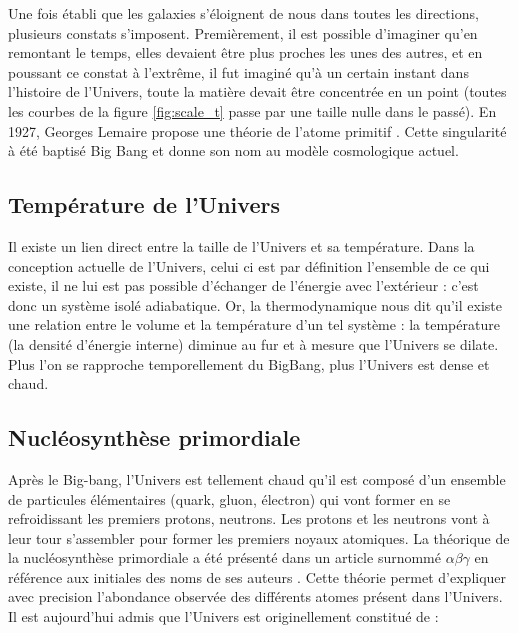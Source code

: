 Une fois établi que les galaxies s'éloignent de nous dans toutes les directions, plusieurs constats s'imposent.
Premièrement, il est possible d'imaginer qu'en remontant le temps, elles devaient être plus proches les unes des autres, et en poussant ce constat à l’extrême, il fut imaginé qu'à un certain instant dans l'histoire de l'Univers, toute la matière devait être concentrée en un point (toutes les courbes de la figure \ref{fig:scale_t} passe par une taille nulle dans le passé).
En 1927, Georges Lemaire propose une théorie de l'atome primitif \cite{1927ASSB...47...49L}.
Cette singularité à été baptisé Big Bang et donne son nom au modèle cosmologique actuel.

\subsection{Température de l'Univers}

Il existe un lien direct entre la taille de l'Univers et sa température.
Dans la conception actuelle de l'Univers, celui ci est par définition l'ensemble de ce qui existe, il ne lui est pas possible d'échanger de l’énergie avec l’extérieur : c'est donc un système isolé adiabatique.
Or, la thermodynamique nous dit qu'il existe une relation entre le volume et la température d'un tel système : la température (la densité d'énergie interne) diminue au fur et à mesure que l'Univers se dilate.
Plus l'on se rapproche temporellement du BigBang, plus l'Univers est dense et chaud.

\subsection{Nucléosynthèse primordiale}
\label{sec:nucleosynthese_primordiale}
Après le Big-bang, l'Univers est tellement chaud qu'il est composé d'un ensemble de particules élémentaires (quark, gluon, électron) qui vont former en se refroidissant les premiers protons, neutrons.
Les protons et les neutrons vont à leur tour s'assembler pour former les premiers noyaux atomiques.
La théorique de la nucléosynthèse primordiale a été présenté dans un article surnommé $\alpha \beta \gamma$ en référence aux initiales des noms de ses auteurs \citep{PhysRev.73.803}.
Cette théorie permet d'expliquer avec precision l'abondance observée des différents atomes présent dans l'Univers.
Il est aujourd'hui admis que l'Univers est originellement constitué de : 

